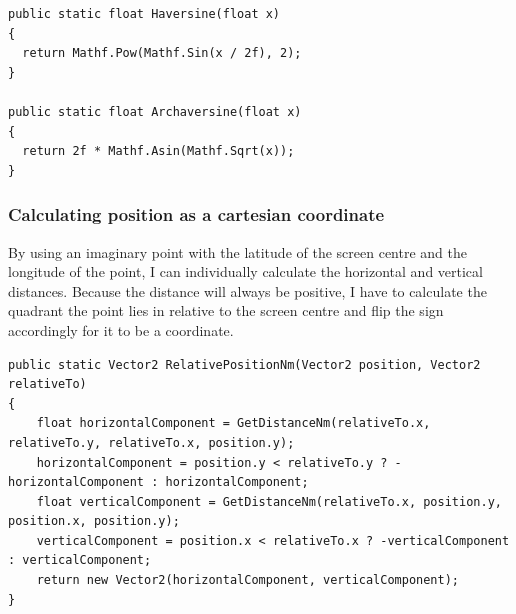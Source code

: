 \documentclass{article}
\begin{document}
\begin{lstlisting}[label={lst:haversine},caption=The haversine functions]
public static float Haversine(float x)
{
  return Mathf.Pow(Mathf.Sin(x / 2f), 2);
}

public static float Archaversine(float x)
{
  return 2f * Mathf.Asin(Mathf.Sqrt(x));
}
\end{lstlisting}

\subsubsection{Calculating position as a cartesian coordinate}
By using an imaginary point with the latitude of the screen centre and the longitude of the point, I can individually calculate the horizontal and vertical distances.
Because the distance will always be positive, I have to calculate the \gls{quadrant} the point lies in relative to the screen centre and flip the sign accordingly for it to be a coordinate.
\lstset{style=csharp}
\begin{lstlisting}[caption=Calculating the position of a point relative to another]
public static Vector2 RelativePositionNm(Vector2 position, Vector2 relativeTo)
{
    float horizontalComponent = GetDistanceNm(relativeTo.x, relativeTo.y, relativeTo.x, position.y);
    horizontalComponent = position.y < relativeTo.y ? -horizontalComponent : horizontalComponent;
    float verticalComponent = GetDistanceNm(relativeTo.x, position.y, position.x, position.y);
    verticalComponent = position.x < relativeTo.x ? -verticalComponent : verticalComponent;
    return new Vector2(horizontalComponent, verticalComponent);
}
\end{lstlisting}
\end{document}
